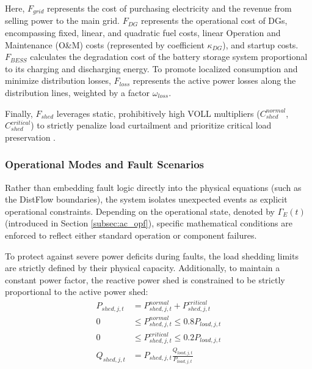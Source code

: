 Here, $F_{grid}$ represents the cost of purchasing electricity and the revenue from selling power to the main grid. $F_{DG}$ represents the operational cost of DGs, encompassing fixed, linear, and quadratic fuel costs, linear Operation and Maintenance (O\&M) costs (represented by coefficient $\kappa_{DG}$), and startup costs. $F_{BESS}$ calculates the degradation cost of the battery storage system proportional to its charging and discharging energy. To promote localized consumption and minimize distribution losses, $F_{loss}$ represents the active power losses along the distribution lines, weighted by a factor $\omega_{loss}$. 

Finally, $F_{shed}$ leverages static, prohibitively high VOLL multipliers ($C_{shed}^{normal}$, $C_{shed}^{critical}$) to strictly penalize load curtailment and prioritize critical load preservation \cite{Hamilton2023_VOLL}. 

\subsubsection{Operational Modes and Fault Scenarios}
\label{subsubsec:operational_modes}

Rather than embedding fault logic directly into the physical equations (such as the DistFlow boundaries), the system isolates unexpected events as explicit operational constraints. Depending on the operational state, denoted by $\Gamma_E(t)$ (introduced in Section \ref{subsec:ac_opf}), specific mathematical conditions are enforced to reflect either standard operation or component failures.

To protect against severe power deficits during faults, the load shedding limits are strictly defined by their physical capacity. Additionally, to maintain a constant power factor, the reactive power shed is constrained to be strictly proportional to the active power shed:
\begin{subequations}
\begin{align}
    P_{shed,j,t} &= P_{shed,j,t}^{normal} + P_{shed,j,t}^{critical} \label{eq:shed_total} \\
    0 &\le P_{shed,j,t}^{normal} \le 0.8 P_{load,j,t} \label{eq:shed_normal_limit} \\
    0 &\le P_{shed,j,t}^{critical} \le 0.2 P_{load,j,t} \label{eq:shed_critical_limit} \\
    Q_{shed,j,t} &= P_{shed,j,t} \frac{Q_{load,j,t}}{P_{load,j,t}} \label{eq:shed_q_ratio}
\end{align}
\end{subequations}

